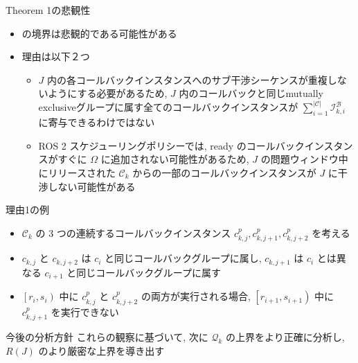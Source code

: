 \begin{frame}{Theorem 1の悲観性}
    \begin{itemize}
        \item {} の境界は悲観的である可能性がある
        \item 理由は以下２つ
              \begin{itemize}
                  \item $J$ 内の各コールバックインスタンスへのサブ干渉シーケンスが重複しないようにする必要があるため, $J$ 内のコールバックと同じmutually exclusiveグループに属す全てのコールバックインスタンスが $\sum_{i=1}^{|\mathcal{C}|} \mathcal{I}_{k, i}^{\mathcal{B}}$ に寄与できるわけではない
                  \item ROS 2 スケジューリングポリシーでは, ready のコールバックインスタンスがすぐに $\Omega$ に追加されない可能性があるため, $J$ の問題ウィンドウ中にリリースされた $\mathcal{C}_{k}$ からの一部のコールバックインスタンスが $J$ に干渉しない可能性がある
              \end{itemize}
    \end{itemize}
\end{frame}

\begin{frame}{理由1の例}
    \begin{itemize}
        \item $\mathcal{C}_{k}$ の 3 つの連続するコールバックインスタンス $c_{k, j}^{p}, c_{k, j+1}^{p}, c_{k, j+2}^{p}$ を考える
        \item $c_{k, j}$ と $c_{k, j+2}$ は $c_{i}$ と同じコールバックグループに属し, $c_{k, j+1}$ は $c_{i}$ とは異なる $c_{i+1}$ と同じコールバックグループに属す
        \item $\left[r_{i}, s_{i}\right)$ 中に $c_{k, j}^{p}$ と $c_{k, j+2}^{p}$ の両方が実行される場合, $\left[r_{i+1}, s_{i+1}\right)$ 中に $c_{k, j+1}^{p}$ を実行できない
    \end{itemize}
\end{frame}

\begin{frame}{今後の分析方針}
    これらの観察に基づいて, 次に $\mathcal{Q}_{k}$ の上界をより正確に分析し, $R(J)$ のより厳密な上界を導き出す
\end{frame}
